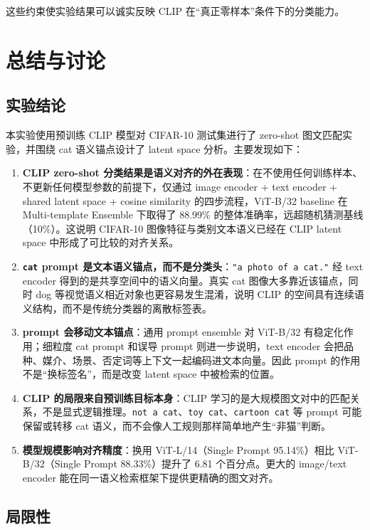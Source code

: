 \documentclass[12pt,a4paper]{ctexart}
\begin{document}
这些约束使实验结果可以诚实反映 CLIP 在“真正零样本”条件下的分类能力。

\section{总结与讨论}

\subsection{实验结论}

本实验使用预训练 CLIP 模型对 CIFAR-10 测试集进行了 zero-shot 图文匹配实验，并围绕 cat 语义锚点设计了 latent space 分析。主要发现如下：

\begin{enumerate}
    \item \textbf{CLIP zero-shot 分类结果是语义对齐的外在表现}：在不使用任何训练样本、不更新任何模型参数的前提下，仅通过 image encoder + text encoder + shared latent space + cosine similarity 的四步流程，ViT-B/32 baseline 在 Multi-template Ensemble 下取得了 88.99\% 的整体准确率，远超随机猜测基线（10\%）。这说明 CIFAR-10 图像特征与类别文本语义已经在 CLIP latent space 中形成了可比较的对齐关系。
    \item \textbf{\texttt{cat} prompt 是文本语义锚点，而不是分类头}：\texttt{"a photo of a cat."} 经 text encoder 得到的是共享空间中的语义向量。真实 cat 图像大多靠近该锚点，同时 dog 等视觉语义相近对象也更容易发生混淆，说明 CLIP 的空间具有连续语义结构，而不是传统分类器的离散标签表。
    \item \textbf{prompt 会移动文本锚点}：通用 prompt ensemble 对 ViT-B/32 有稳定化作用；细粒度 cat prompt 和误导 prompt 则进一步说明，text encoder 会把品种、媒介、场景、否定词等上下文一起编码进文本向量。因此 prompt 的作用不是“换标签名”，而是改变 latent space 中被检索的位置。
    \item \textbf{CLIP 的局限来自预训练目标本身}：CLIP 学习的是大规模图文对中的匹配关系，不是显式逻辑推理。\texttt{not a cat}、\texttt{toy cat}、\texttt{cartoon cat} 等 prompt 可能保留或转移 cat 语义，而不会像人工规则那样简单地产生“非猫”判断。
    \item \textbf{模型规模影响对齐精度}：换用 ViT-L/14（Single Prompt 95.14\%）相比 ViT-B/32（Single Prompt 88.33\%）提升了 6.81 个百分点。更大的 image/text encoder 能在同一语义检索框架下提供更精确的图文对齐。
\end{enumerate}

\subsection{局限性}
\end{document}
